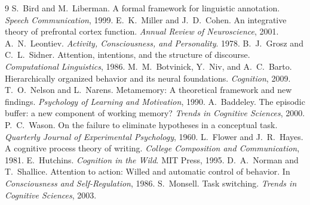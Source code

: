 \documentclass[11pt]{article}
\begin{document}
\begin{thebibliography}{9}
 S.~Bird and M.~Liberman. A formal framework for linguistic annotation.
  \emph{Speech Communication}, 1999.
 E.~K.~Miller and J.~D.~Cohen. An integrative theory of prefrontal cortex
  function. \emph{Annual Review of Neuroscience}, 2001.
 A.~N.~Leontiev. \emph{Activity, Consciousness, and Personality}. 1978.
 B.~J.~Grosz and C.~L.~Sidner. Attention, intentions, and the structure of
  discourse. \emph{Computational Linguistics}, 1986.
 M.~M.~Botvinick, Y.~Niv, and A.~C.~Barto. Hierarchically organized
  behavior and its neural foundations. \emph{Cognition}, 2009.
 T.~O.~Nelson and L.~Narens. Metamemory: A theoretical framework and new
  findings. \emph{Psychology of Learning and Motivation}, 1990.
 A.~Baddeley. The episodic buffer: a new component of working memory?
  \emph{Trends in Cognitive Sciences}, 2000.
 P.~C.~Wason. On the failure to eliminate hypotheses in a conceptual task.
  \emph{Quarterly Journal of Experimental Psychology}, 1960.
 L.~Flower and J.~R.~Hayes. A cognitive process theory of writing.
  \emph{College Composition and Communication}, 1981.
 E.~Hutchins. \emph{Cognition in the Wild}. MIT Press, 1995.
 D.~A.~Norman and T.~Shallice. Attention to action: Willed and automatic
  control of behavior. In \emph{Consciousness and Self-Regulation}, 1986.
 S.~Monsell. Task switching. \emph{Trends in Cognitive Sciences}, 2003.
\end{thebibliography}
\end{document}
